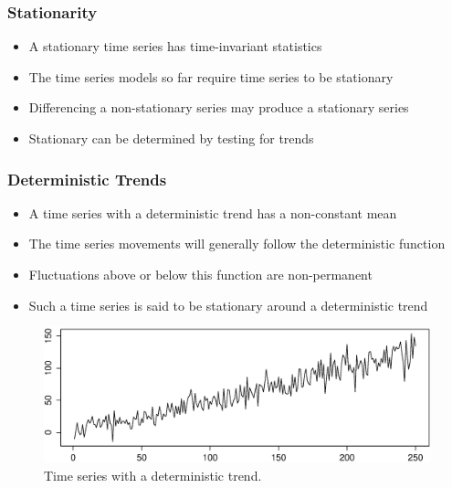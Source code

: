 \documentclass[presentation]{beamer}
\begin{document}
\begin{frame}[t]
\frametitle{Stationarity}
\begin{itemize}
\item{A stationary time series has time-invariant statistics}
\item{The time series models so far require time series to be stationary}
\item{Differencing a non-stationary series may produce a stationary series}
\item{Stationary can be determined by testing for trends}
\end{itemize}
\end{frame}

\begin{frame}[t]
\frametitle{Deterministic Trends}
\footnotesize{
\begin{itemize}
\item{A time series with a deterministic trend has a non-constant mean}
\item{The time series movements will generally follow the deterministic function}
\item{Fluctuations above or below this function are non-permanent}
\item{Such a time series is said to be stationary around a deterministic trend}
\end{itemize}
}
\begin{figure}[htbp]
\begin{center}
\includegraphics[width=\textwidth]{assets/deterministic_trend.eps}
\caption{Time series with a deterministic trend.}
\end{center}
\end{figure}
\end{frame}
\end{document}
